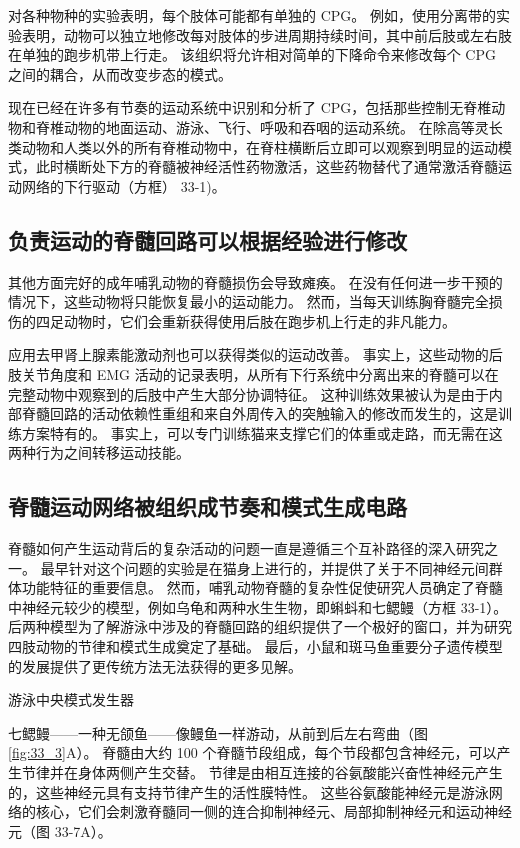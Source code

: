 对各种物种的实验表明，每个肢体可能都有单独的 CPG。 例如，使用分离带的实验表明，动物可以独立地修改每对肢体的步进周期持续时间，其中前后肢或左右肢在单独的跑步机带上行走。 该组织将允许相对简单的下降命令来修改每个 CPG 之间的耦合，从而改变步态的模式。

现在已经在许多有节奏的运动系统中识别和分析了 CPG，包括那些控制无脊椎动物和脊椎动物的地面运动、游泳、飞行、呼吸和吞咽的运动系统。 在除高等灵长类动物和人类以外的所有脊椎动物中，在脊柱横断后立即可以观察到明显的运动模式，此时横断处下方的脊髓被神经活性药物激活，这些药物替代了通常激活脊髓运动网络的下行驱动（方框） 33-1)。

\subsection{负责运动的脊髓回路可以根据经验进行修改}
其他方面完好的成年哺乳动物的脊髓损伤会导致瘫痪。 在没有任何进一步干预的情况下，这些动物将只能恢复最小的运动能力。 然而，当每天训练胸脊髓完全损伤的四足动物时，它们会重新获得使用后肢在跑步机上行走的非凡能力。

应用去甲肾上腺素能激动剂也可以获得类似的运动改善。 事实上，这些动物的后肢关节角度和 EMG 活动的记录表明，从所有下行系统中分离出来的脊髓可以在完整动物中观察到的后肢中产生大部分协调特征。 这种训练效果被认为是由于内部脊髓回路的活动依赖性重组和来自外周传入的突触输入的修改而发生的，这是训练方案特有的。 事实上，可以专门训练猫来支撑它们的体重或走路，而无需在这两种行为之间转移运动技能。




\subsection{脊髓运动网络被组织成节奏和模式生成电路}

脊髓如何产生运动背后的复杂活动的问题一直是遵循三个互补路径的深入研究之一。 最早针对这个问题的实验是在猫身上进行的，并提供了关于不同神经元间群体功能特征的重要信息。 然而，哺乳动物脊髓的复杂性促使研究人员确定了脊髓中神经元较少的模型，例如乌龟和两种水生生物，即蝌蚪和七鳃鳗（方框 33-1）。 后两种模型为了解游泳中涉及的脊髓回路的组织提供了一个极好的窗口，并为研究四肢动物的节律和模式生成奠定了基础。 最后，小鼠和斑马鱼重要分子遗传模型的发展提供了更传统方法无法获得的更多见解。

游泳中央模式发生器

七鳃鳗——一种无颌鱼——像鳗鱼一样游动，从前到后左右弯曲（图 \ref{fig:33_3}A）。 脊髓由大约 100 个脊髓节段组成，每个节段都包含神经元，可以产生节律并在身体两侧产生交替。 节律是由相互连接的谷氨酸能兴奋性神经元产生的，这些神经元具有支持节律产生的活性膜特性。 这些谷氨酸能神经元是游泳网络的核心，它们会刺激脊髓同一侧的连合抑制神经元、局部抑制神经元和运动神经元（图 33-7A）。

